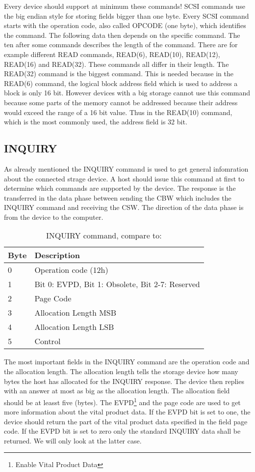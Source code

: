 Every device should support at minimum these commands! SCSI commands use the big endian style for storing fields bigger than one byte. Every SCSI command starts with the operation code, also called OPCODE (one byte), which identifies the command. The following data then depends on the specific command. The ten after some commands describes the length of the command. There are for example different READ commands, READ(6), READ(10), READ(12), READ(16) and READ(32)\cite{scsi_seagate}. These commands all differ in their length. The READ(32) command is the biggest command. This is needed because in the READ(6) command, the logical block address field which is used to address a block is only 16 bit. However devices with a big storage cannot use this command because some parts of the memory cannot be addressed because their address would exceed the range of a 16 bit value. Thus in the READ(10) command, which is the most commonly used, the address field is 32 bit.

\subsection{INQUIRY}

As already mentioned the INQUIRY command is used to get general infomration about the connected strage device. A host should issue this command at first to determine which commands are supported by the device. The response is the transferred in the data phase between sending the CBW which includes the INQUIRY command and receiving the CSW. The direction of the data phase is from the device to the computer.

\begin{table}[ht]
\caption{INQUIRY command, compare to: \cite{scsi_seagate}}
\centering
\begin{tabular}{|l|l|}
\hline\hline
\textbf{Byte} & \textbf{Description}\\ \hline
0 & Operation code (12h) \\ \hline
1 & Bit 0: EVPD, Bit 1: Obsolete, Bit 2-7: Reserved\\ \hline
2 & Page Code \\ \hline
3 & Allocation Length MSB \\ \hline
4 & Allocation Length LSB \\ \hline
5 & Control \\ \hline
\end{tabular}
\label{table:inquiry}
\end{table}

The most important fields in the INQUIRY command are the operation code and the allocation length. The allocation length tells the storage device how many bytes the host has allocated for the INQUIRY response. The device then replies with an answer at most as big as the allocation length. The allocation field should be at leasst five (bytes). The EVPD\footnote{Enable Vital Product Data} and the page code are used to get more information about the vital product data. If the EVPD bit is set to one, the device should return the part of the vital product data specified in the field page code. If the EVPD bit is set to zero only the standard INQUIRY data shall be returned\cite{scsi_seagate}. We will only look at the latter case.


